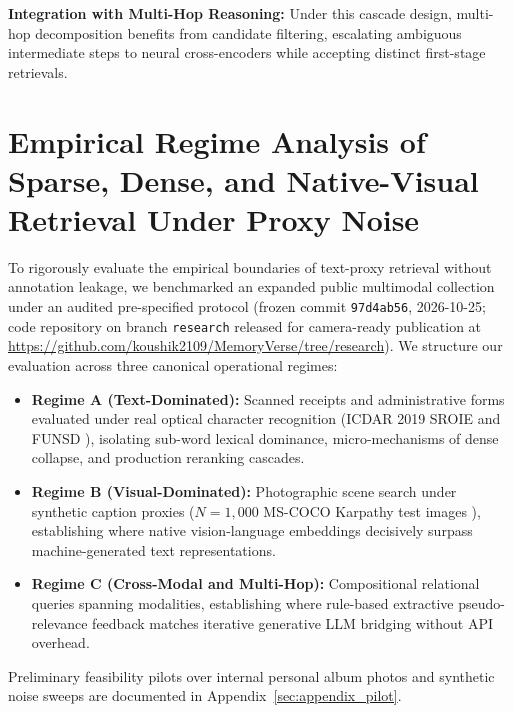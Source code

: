 \documentclass[conference]{IEEEtran}
\begin{document}
\textbf{Integration with Multi-Hop Reasoning:} Under this cascade design, multi-hop decomposition benefits from candidate filtering, escalating ambiguous intermediate steps to neural cross-encoders while accepting distinct first-stage retrievals.


\section{Empirical Regime Analysis of Sparse, Dense, and Native-Visual Retrieval Under Proxy Noise}
\label{sec:regime_analysis}
\label{sec:public_regime_analysis}

To rigorously evaluate the empirical boundaries of text-proxy retrieval without annotation leakage, we benchmarked an expanded public multimodal collection under an audited pre-specified protocol (frozen commit \texttt{97d4ab56}, 2026-10-25; code repository on branch \texttt{research} released for camera-ready publication at \url{https://github.com/koushik2109/MemoryVerse/tree/research}). We structure our evaluation across three canonical operational regimes:
\begin{itemize}
    \setlength{\itemsep}{0.2pt plus 0.1pt}
    \setlength{\parskip}{0pt}
    \item \textbf{Regime A (Text-Dominated):} Scanned receipts and administrative forms evaluated under real optical character recognition (ICDAR 2019 SROIE \cite{huang2019sroie} and FUNSD \cite{jaume2019funsd}), isolating sub-word lexical dominance, micro-mechanisms of dense collapse, and production reranking cascades.
    \item \textbf{Regime B (Visual-Dominated):} Photographic scene search under synthetic caption proxies ($N=1{,}000$ MS-COCO Karpathy test images \cite{lin2014coco}), establishing where native vision-language embeddings decisively surpass machine-generated text representations.
    \item \textbf{Regime C (Cross-Modal and Multi-Hop):} Compositional relational queries spanning modalities, establishing where rule-based extractive pseudo-relevance feedback matches iterative generative LLM bridging without API overhead.
\end{itemize}
Preliminary feasibility pilots over internal personal album photos and synthetic noise sweeps are documented in Appendix~\ref{sec:appendix_pilot}.
\end{document}
